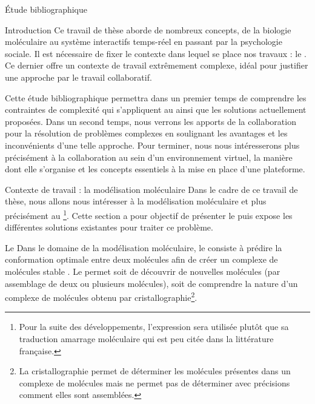 \documentclass[myfrancais,ngerman,english,frenchb]{mythesis}
\begin{document}
	\begin{mychapter}{Étude bibliographique}
		\begin{mysection}{Introduction}
			Ce travail de thèse aborde de nombreux concepts, de la biologie moléculaire au système interactifs temps-réel en passant par la psychologie sociale.
			Il est nécessaire de fixer le contexte dans lequel se place nos travaux : le .
			Ce dernier offre un contexte de travail extrêmement complexe, idéal pour justifier une approche par le travail collaboratif.

			Cette étude bibliographique permettra dans un premier temps de comprendre les contraintes de complexité qui s'appliquent au  ainsi que les solutions actuellement proposées.
			Dans un second temps, nous verrons les apports de la collaboration pour la résolution de problèmes complexes en soulignant les avantages et les inconvénients d'une telle approche.
			Pour terminer, nous nous intéresserons plus précisément à la collaboration au sein d'un environnement virtuel, la manière dont elle s'organise et les concepts essentiels à la mise en place d'une plateforme.
		\end{mysection}
		\begin{mysection}{Contexte de travail : la modélisation moléculaire}
			Dans le cadre de ce travail de thèse, nous allons nous intéresser à la modélisation moléculaire et plus précisément au \footnote{Pour la suite des développements, l'expression \og {} \fg sera utilisée plutôt que sa traduction \og amarrage moléculaire \fg {} qui est peu citée dans la littérature française.}.
			Cette section a pour objectif de présenter le  puis expose les différentes solutions existantes pour traiter ce problème.
			\begin{mysubsection}{Le }
				Dans le domaine de la modélisation moléculaire, le  consiste à prédire la conformation optimale entre deux molécules afin de créer un complexe de molécules stable .
				Le  permet soit de découvrir de nouvelles molécules (par assemblage de deux ou plusieurs molécules), soit de comprendre la nature d'un complexe de molécules obtenu par cristallographie\footnote{La cristallographie permet de déterminer les molécules présentes dans un complexe de molécules mais ne permet pas de déterminer avec précisions comment elles sont assemblées.}.

\end{mysubsection}
\end{mysection}
\end{mychapter}
\end{document}
